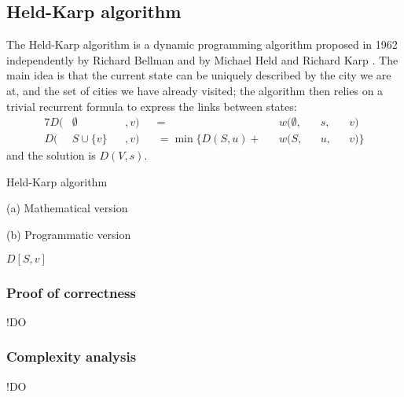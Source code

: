 \subsection{Held-Karp algorithm} \label{algorithm-tsp-heldkarp}
The Held-Karp algorithm is a dynamic programming algorithm proposed in 1962 independently by Richard Bellman \cite{bellman62} and by Michael Held and Richard Karp \cite{held-karp62}. The main idea is that the current state can be uniquely described by the city we are at, and the set of cities we have already visited; the algorithm then relies on a trivial recurrent formula to express the links between states:
\begin{alignat*}{7}
    D(&\emptyset   &&, v) &&=                && w(\emptyset,&&s,&&v)\\
    D(&S \cup \{v\}&&, v) &&=\min\{D(S, u) + && w(S        ,&&u,&&v)\}
\end{alignat*}
and the solution is $D(V, s)$.
\begin{center}
    \begin{algorithm}[ht]
        \caption{Held-Karp algorithm}
        \label{alg:held-karp}
        \begin{minipage}[t]{0.49\linewidth}
            (a) Mathematical version
            \begin{algorithmic}[1]
                     
                    \EndIf
                    \EndFor
                    \State {}
                \EndFunction
            \end{algorithmic}
        \end{minipage}
        \begin{minipage}[t]{0.49\linewidth}
            (b) Programmatic version
            \begin{algorithmic}[1]
                     
                    \EndIf
                     \Return $D[S,v]$
                    \EndIf
                    \EndFor
                    \State {}
                \EndFunction
            \end{algorithmic}
        \end{minipage}
    \end{algorithm}
\end{center}
\subsubsection{Proof of correctness}
!DO
\subsubsection{Complexity analysis}
!DO
